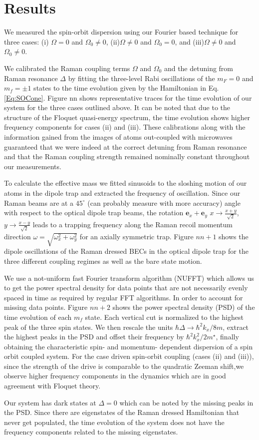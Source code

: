 \section{Results}

We measured the spin-orbit dispersion using our Fourier based technique  for three cases: (i) $\Omega=0$ and $\Omega_0\neq0$, (ii)$\Omega\neq0$ and $\Omega_0=0$, and (iii)$\Omega\neq0$ and $\Omega_0\neq0$. 


We calibrated the Raman coupling terms $\Omega$ and $\Omega_0$ and the detuning from Raman resonance $\Delta$ by fitting the three-level Rabi oscillations of the $m_F=0$ and $m_f=\pm 1$ states to the time evolution given by the Hamiltonian in Eq. \ref{Eq:SOCone}. Figure nn shows representative traces for the time evolution of our system for the three cases outlined above. It can be noted that due to the structure of the Floquet quasi-energy spectrum, the time evolution shows higher frequency components for cases (ii) and (iii). These calibrations along with the information gained from the images of atoms out-coupled  with microwaves guaranteed that we were indeed at the correct detuning from Raman resonance and that the Raman coupling strength remained nominally constant throughout our measurements. 

To calculate the effective mass we fitted sinusoids to the sloshing motion of our atoms in the dipole trap and extracted the frequency of oscillation. Since our Raman beams are at a $45^{\circ}$ (can probably measure with more accuracy) angle with respect to the optical dipole trap beams, the rotation $\mathbf{e}_x+\mathbf{e}_y$   $x\rightarrow\frac{x+y}{\sqrt{2}}$, $y\rightarrow\frac{x-y}{\sqrt{2}}$ leads to a trapping frequency along the Raman recoil momentum direction
$\omega=\sqrt{\omega_x^2+\omega_y^2}$ for an axially symmetric trap.  
Figure $nn+1$ shows the dipole oscillations of the Raman dressed BECs in the optical dipole trap for the three different coupling regimes as well as the bare state motion. 

We use a not-uniform fast Fourier transform algorithm (NUFFT) which allows us to get the power spectral density for data points that are not necessarily evenly spaced in time as required by regular FFT algorithms. In order to account for missing data points. Figure $nn+2$ shows the power spectral density (PSD) of the time evolution of each $m_f$ state. Each vertical cut is normalized to the highest peak of the three spin states. We then rescale the units $\hbar\Delta\rightarrow	 \hbar^2k_x/8m$, extract the highest peaks in the PSD and offset their frequency by $\hbar^2k_x^2/2m^{\star}$, finally obtaining the characteristic spin- and momentum- dependent dispersion of a spin orbit coupled system. For the case driven spin-orbit coupling (cases (ii) and (iii)), since the strength of the drive is comparable to the quadratic Zeeman shift,we observe higher frequency components in the dynamics which are in good agreement with Floquet theory.

Our system has dark states at $\Delta=0$ which can be noted by the missing peaks in the PSD. Since there are eigenstates of the Raman dressed Hamiltonian that never get populated, the time evolution of the system does not have the frequency components related to the missing eigenstates. 
